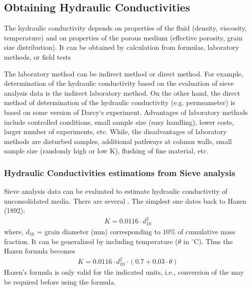 \documentclass[letterpaper,10pt,english]{jupyterBook}
\begin{document}
\subsection{Obtaining Hydraulic Conductivities}
\label{\detokenize{content/flow/L4/14_darcy_law_K:obtaining-hydraulic-conductivities}}
\sphinxAtStartPar
The hydraulic conductivity depends on properties of the fluid (density, viscosity,
temperature) and on properties of the porous medium (effective porosity, grain size
distribution). It can be obtained by calculation from formulas, laboratory methods, or
field tests

\sphinxAtStartPar
The laboratory method can be indirect method or direct method. For example,
determination of the hydraulic conductivity based on the evaluation of sieve analysis
data is the indirect laboratory method. On the other hand, the direct method of
determination of the hydraulic conductivity (e.g. permeameter) is based on some version of Darcy‘s experiment. Advantages of laboratory methods include controlled
conditions, small sample size (easy handling), lower costs, larger number of
experiments, etc. While, the disadvantages of laboratory methods are disturbed
samples, additional pathways at column walls, small sample size (randomly high or low
K), flushing of fine material, etc.


\subsubsection{Hydraulic Conductivities estimations from Sieve analysis}
\label{\detokenize{content/flow/L4/14_darcy_law_K:hydraulic-conductivities-estimations-from-sieve-analysis}}
\sphinxAtStartPar
Sieve analysis data can be evaluated to estimate hydraulic conductivity of
unconsolidated media. There are several . The simplest one dates back to Hazen (1892):
\begin{equation*}
\begin{split}
K = 0.0116 \cdot d_{10}^2
\end{split}
\end{equation*}
\sphinxAtStartPar
where, \(d_{10}\) = grain diameter (mm) corresponding to \(10
\%\) of cumulative mass fraction. It can be generalized by including temperature (\(\theta\) in \(^\circ\)C). Thus the Hazen formula becomes
\begin{equation*}
\begin{split}
K = 0.0116 \cdot d_{10}^2 \cdot (0.7 + 0.03\cdot\theta)
\end{split}
\end{equation*}
\sphinxAtStartPar
Hazen’s formula is only valid for the indicated units, i.e., conversion of the  may be required before using the formula.
\end{document}
